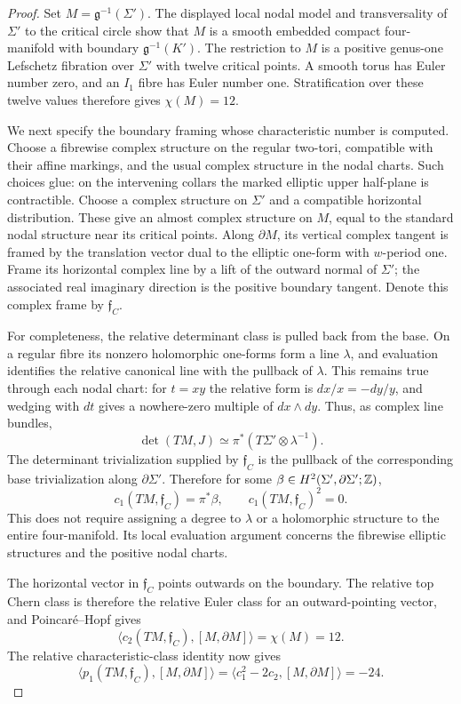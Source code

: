 \begin{proof}
Set $M=\mathfrak g^{-1}(\Sigma')$. The displayed local nodal
model and transversality of $\Sigma'$ to the critical circle
show that $M$ is a smooth embedded compact four-manifold with
boundary $\mathfrak g^{-1}(K')$. The restriction to $M$ is a
positive genus-one Lefschetz fibration over $\Sigma'$ with
twelve critical points. A smooth torus has Euler number zero,
and an $I_1$ fibre has Euler number one. Stratification over
these twelve values therefore gives $\chi(M)=12$.

We next specify the boundary framing whose characteristic number
is computed. Choose a fibrewise complex structure on the regular
two-tori, compatible with their affine markings, and the usual
complex structure in the nodal charts. Such choices glue: on
the intervening collars the marked elliptic upper half-plane
is contractible. Choose a complex structure on $\Sigma'$ and
a compatible horizontal distribution. These give an almost
complex structure on $M$, equal to the standard nodal structure
near its critical points. Along $\partial M$, its vertical
complex tangent is framed by the translation vector dual to
the elliptic one-form with $w$-period one. Frame its horizontal
complex line by a lift of the outward normal of $\Sigma'$;
the associated real imaginary direction is the positive
boundary tangent. Denote this complex frame by $\mathfrak f_C$.

For completeness, the relative determinant class is pulled
back from the base. On a regular fibre its nonzero holomorphic
one-forms form a line $\lambda$, and evaluation identifies
the relative canonical line with the pullback of $\lambda$.
This remains true through each nodal chart: for $t=xy$ the
relative form is $dx/x=-dy/y$, and wedging with $dt$ gives
a nowhere-zero multiple of $dx\wedge dy$. Thus, as complex
line bundles,
\[
 \det(TM,J)\simeq\pi^*(T\Sigma'\otimes\lambda^{-1}).
\]
The determinant trivialization supplied by $\mathfrak f_C$
is the pullback of the corresponding base trivialization along
$\partial\Sigma'$. Therefore for some
$\beta\in H^2(\Sigma',\partial\Sigma';\mathbb Z)$,
\[
 c_1(TM,\mathfrak f_C)=\pi^*\beta,
 \qquad c_1(TM,\mathfrak f_C)^2=0.
\]
This does not require assigning a degree to $\lambda$ or a
holomorphic structure to the entire four-manifold. Its local
evaluation argument concerns the fibrewise elliptic structures
and the positive nodal charts.

The horizontal vector in $\mathfrak f_C$ points outwards on
the boundary. The relative top Chern class is therefore the
relative Euler class for an outward-pointing vector, and
Poincar\'e--Hopf gives
\[
 \langle c_2(TM,\mathfrak f_C),[M,\partial M]\rangle
 =\chi(M)=12.
\]
The relative characteristic-class identity now gives
\[
 \langle p_1(TM,\mathfrak f_C),[M,\partial M]\rangle
 =\langle c_1^2-2c_2,[M,\partial M]\rangle=-24.
\]


\end{proof}
